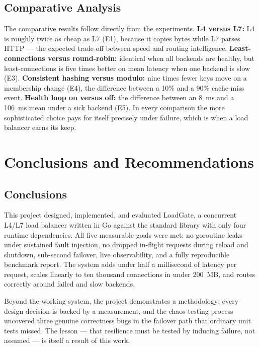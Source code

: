 \documentclass[11pt,a4paper]{report}
\begin{document}
\section{Comparative Analysis}
The comparative results follow directly from the experiments. \textbf{L4 versus L7:} L4 is
roughly twice as cheap as L7 (E1), because it copies bytes while L7 parses HTTP --- the expected
trade-off between speed and routing intelligence. \textbf{Least-connections versus round-robin:}
identical when all backends are healthy, but least-connections is five times better on mean
latency when one backend is slow (E3). \textbf{Consistent hashing versus modulo:} nine times
fewer keys move on a membership change (E4), the difference between a 10\% and a 90\%
cache-miss event. \textbf{Health loop on versus off:} the difference between an 8~ms and a 106~ms
mean under a sick backend (E5). In every comparison the more sophisticated choice pays for itself
precisely under failure, which is when a load balancer earns its keep.

\chapter{Conclusions and Recommendations}

\section{Conclusions}
This project designed, implemented, and evaluated LoadGate, a concurrent L4/L7 load balancer
written in Go against the standard library with only four runtime dependencies. All five
measurable goals were met: no goroutine leaks under sustained fault injection, no dropped
in-flight requests during reload and shutdown, sub-second failover, live observability, and a
fully reproducible benchmark report. The system adds under half a millisecond of latency per
request, scales linearly to ten thousand connections in under 200~MB, and routes correctly around
failed and slow backends.

Beyond the working system, the project demonstrates a methodology: every design decision is
backed by a measurement, and the chaos-testing process uncovered three genuine correctness bugs
in the failover path that ordinary unit tests missed. The lesson --- that resilience must be
tested by inducing failure, not assumed --- is itself a result of this work.
\end{document}
